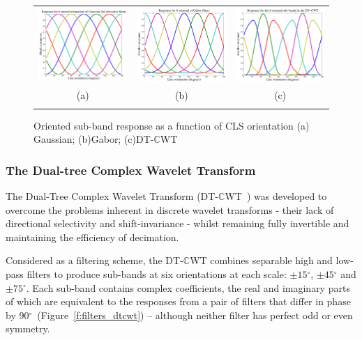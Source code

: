 \documentclass{IEEEtran}
\newcommand{\fref}[1]{Figure~\ref{#1}}
\def\dtcwt{DT-$\mathbb{C}$WT}
\def\deg{\ensuremath{^\circ}}
\begin{document}
\begin{figure}[t]
\centering
\begin{tabular}{@{}c c c@{}} %
\includegraphics[width=0.3\columnwidth]{figs/filtering/g2d_oriented_response} &
\includegraphics[width=0.3\columnwidth]{figs/filtering/gabor_oriented_response} &
\includegraphics[width=0.3\columnwidth]{figs/filtering/dt_oriented_response} \\
(a) & (b) & (c) \\
\noalign{\smallskip}
\end{tabular}
%
\caption{Oriented sub-band response as a function of CLS orientation (a) Gaussian; (b)Gabor; (c)\dtcwt{} }
\label{f:oriented_responses}
\end{figure}


\subsubsection{The Dual-tree Complex Wavelet Transform}
\label{s:filtering_dtcwt}

The Dual-Tree Complex Wavelet Transform (\dtcwt{}~\cite{Kingsbury_ACHA01}) was developed to overcome the problems inherent in discrete wavelet transforms - their lack of directional selectivity and shift-invariance - whilst remaining fully invertible and maintaining the efficiency of decimation.

Considered as a filtering scheme, the \dtcwt{} combines separable high and low-pass filters to produce sub-bands at six orientations at each scale: $\pm 15\deg$, $\pm 45\deg$ and $\pm 75\deg$. Each sub-band contains complex coefficients, the real and imaginary parts of which are equivalent to the responses from a pair of filters that differ in phase by $90\deg$~(\fref{f:filters_dtcwt}) -- although neither filter has perfect odd or even symmetry.
\end{document}
